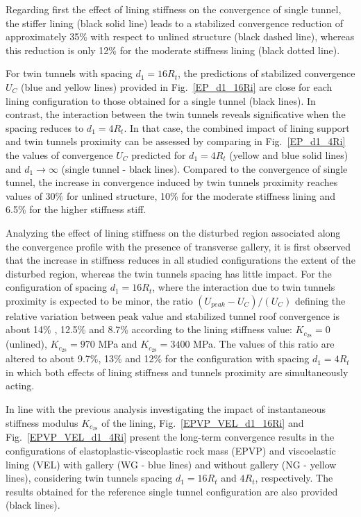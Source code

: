 \documentclass[a4paper,fleqn]{cas-sc}
\begin{document}
Regarding first the effect of lining stiffness on the convergence of single tunnel, the stiffer lining (black solid line) leads to a stabilized convergence reduction of approximately 35\% with respect to unlined structure (black dashed line), whereas this reduction is only 12\% for the moderate stiffness lining (black dotted line).

For twin tunnels with spacing $d_1=16R_t$, the predictions of stabilized convergence $U_C$ (blue and yellow lines) provided in Fig.~\ref{EP_d1_16Ri} are close for each lining configuration to those obtained for a single tunnel (black lines). In contrast, the interaction between the twin tunnels reveals significative when the spacing reduces to $d_1=4R_t$. In that case, the combined impact of lining support and twin tunnels proximity can be assessed by comparing in Fig.~\ref{EP_d1_4Ri} the values of convergence $U_C$ predicted for $d_1=4R_t$ (yellow and blue solid lines) and $d_1 \rightarrow \infty$ (single tunnel - black lines). Compared to the convergence of single tunnel, the increase in convergence induced by twin tunnels proximity reaches values of 30\% for unlined structure, 10\% for the moderate stiffness lining  and 6.5\% for the higher stiffness stiff. 


Analyzing the effect of lining stiffness on the disturbed region associated along the convergence profile with the presence of transverse gallery, it is first observed that the increase in stiffness reduces in all studied configurations the extent of the disturbed region, whereas the twin tunnels spacing has little impact. For the configuration of spacing $d_1=16R_t$, where the interaction due to twin tunnels proximity is expected to be minor,   the ratio $(U_{peak}-U_C)/(U_C)$ defining the relative variation between peak value and stabilized tunnel roof convergence is about 14\% , 12.5\% and 8.7\% according to the lining stiffness value: $K_{c_{28}}=0$ (unlined), $K_{c_{28}}=970$ MPa and $K_{c_{28}}=3400$ MPa. The values of this ratio are altered to about 9.7\%, 13\% and 12\% for the configuration with spacing $d_1=4R_t$ in which both effects of lining stiffness and tunnels proximity are simultaneously acting.

In line with the previous analysis investigating the impact of instantaneous stiffness modulus $K_{c_{28}}$ of the lining, Fig.~\ref{EPVP_VEL_d1_16Ri} and Fig.~\ref{EPVP_VEL_d1_4Ri} present the long-term convergence results in the configurations of elastoplastic-viscoplastic rock mass (EPVP) and  viscoelastic lining (VEL) with gallery (WG - blue lines) and without gallery (NG - yellow lines), considering  twin tunnels spacing $d_1=16R_t$ and $4R_t$, respectively. The results obtained for the reference single tunnel configuration are also provided (black lines).
\end{document}
